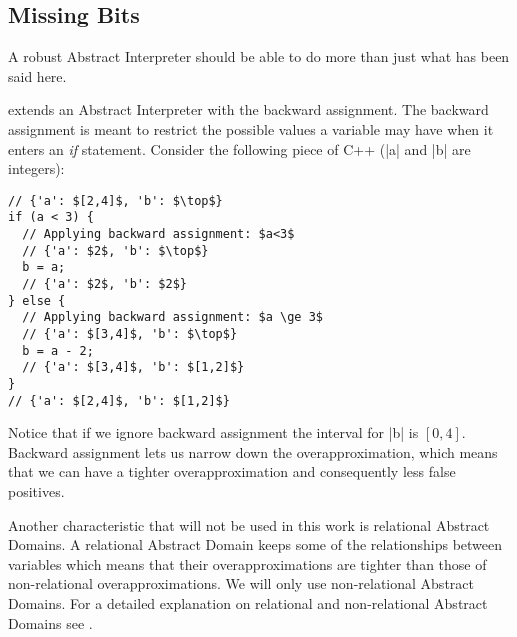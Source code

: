 \subsection{Missing Bits}\label{missing-bits}

A robust Abstract Interpreter should be able to do more than just what
has been said here.

\textcite{mine_weakly_2004} extends an Abstract Interpreter with the
backward assignment. The backward assignment is meant to restrict the
possible values a variable may have when it enters an \emph{if}
statement. Consider the following piece of C++ (\pycode|a| and
\pycode|b| are integers):

\begin{verbatim}
// {'a': $[2,4]$, 'b': $\top$}
if (a < 3) {
  // Applying backward assignment: $a<3$
  // {'a': $2$, 'b': $\top$}
  b = a;
  // {'a': $2$, 'b': $2$}
} else {
  // Applying backward assignment: $a \ge 3$
  // {'a': $[3,4]$, 'b': $\top$}
  b = a - 2;
  // {'a': $[3,4]$, 'b': $[1,2]$}
}
// {'a': $[2,4]$, 'b': $[1,2]$}
\end{verbatim}

Notice that if we ignore backward assignment the interval for \pycode|b| is \([0,4]\).
Backward assignment lets us narrow down the overapproximation, which means that we can
have a tighter overapproximation and consequently less false positives.

Another characteristic that will not be used in this work is relational Abstract Domains.
A relational Abstract Domain keeps some of the relationships between variables which means
that their overapproximations are tighter than those of non-relational overapproximations.
We will only use non-relational Abstract Domains. For a detailed explanation on relational
and non-relational Abstract Domains see \textcite{mine_weakly_2004}.

